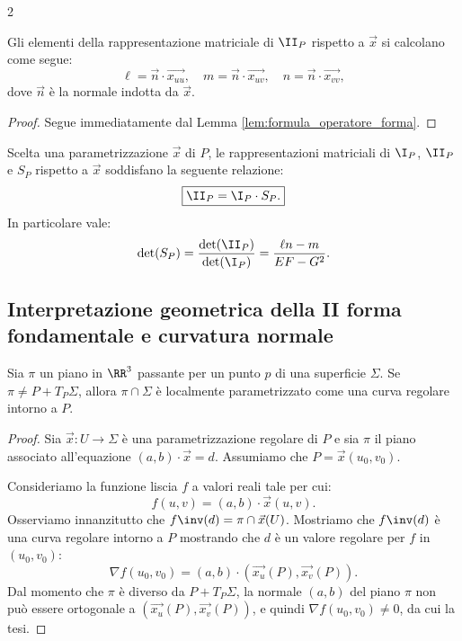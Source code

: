 \begin{multicols*}{2}
    \begin{proposition}
        Gli elementi della rappresentazione matriciale di $\II_P$ rispetto a $\vec{x}$
        si calcolano come segue:
        \[
            \boxed{\ell = \vec{n} \cdot \vec{x_{uu}}, \quad m = \vec{n} \cdot \vec{x_{uv}}, \quad n = \vec{n} \cdot \vec{x_{vv}},}
        \]
        dove $\vec{n}$ è la normale indotta da $\vec{x}$.
    \end{proposition}

    \begin{proof}
        Segue immediatamente dal Lemma \ref{lem:formula_operatore_forma}.
    \end{proof}

    \begin{proposition} \label{prop:formula_forme}
        Scelta una parametrizzazione $\vec{x}$ di $P$, le rappresentazioni
        matriciali di $\I_P$, $\II_P$ e $S_P$ rispetto a $\vec{x}$ soddisfano
        la seguente relazione:
        \[
            \boxed{\II_P = \I_P \cdot S_P.}
        \]
        In particolare vale:
        \[ \det(S_P) = \frac{\det(\II_P)}{\det(\I_P)} = \frac{\ell n - m}{EF-G^2}. \]
    \end{proposition}

    \subsection{Interpretazione geometrica della II forma fondamentale e curvatura normale}

    \begin{proposition}
        Sia $\pi$ un piano in $\RR^3$ passante
        per un punto $p$ di una superficie $\Sigma$. Se $\pi \neq P + T_P \Sigma$,
        allora $\pi \cap \Sigma$ è localmente parametrizzato come una curva regolare
        intorno a $P$.
    \end{proposition}

    \begin{proof}
        Sia $\vec{x} : U \to \Sigma$ è una parametrizzazione regolare di $P$ e sia $\pi$
        il piano associato all'equazione $(a, b) \cdot \vec{x} = d$. Assumiamo che
        $P = \vec{x}(u_0, v_0)$. \smallskip

        Consideriamo la funzione liscia $f$ a valori reali tale per cui:
        \[ f(u, v) = (a, b) \cdot \vec{x}(u, v). \]
        Osserviamo innanzitutto che $f\inv(d) = \pi \cap \vec{x}(U)$. Mostriamo
        che $f\inv(d)$ è una curva regolare intorno a $P$ mostrando che $d$ è
        un valore regolare per $f$ in $(u_0, v_0)$:
        \[
            \nabla f(u_0, v_0) = (a, b) \cdot (\vec{x_u}(P), \vec{x_v}(P)).
        \]
        Dal momento che $\pi$ è diverso da $P + T_P \Sigma$, la normale $(a, b)$ del piano
        $\pi$ non può essere ortogonale a $(\vec{x_u}(P), \vec{x_v}(P))$, e quindi
        $\nabla f(u_0, v_0) \neq 0$, da cui la tesi.
    \end{proof}


\end{multicols*}
